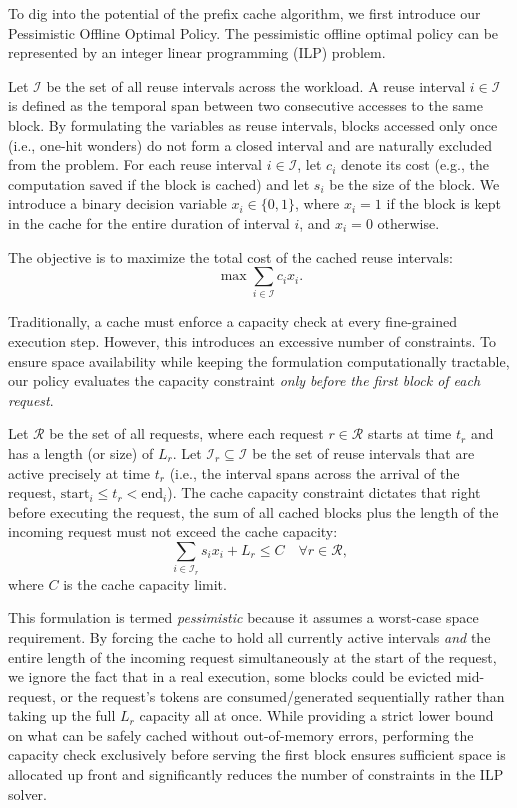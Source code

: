\documentclass[letterpaper,twocolumn,10pt]{article}
\begin{document}
To dig into the potential of the prefix cache algorithm, we first introduce
our Pessimistic Offline Optimal Policy. The pessimistic offline optimal policy
can be represented by an integer linear programming (ILP) problem.

Let $\mathcal{I}$ be the set of all reuse intervals across the workload. 
A reuse interval $i \in \mathcal{I}$ is defined as the temporal span between
two consecutive accesses to the same block. 
By formulating the variables as reuse intervals, blocks accessed only once
(i.e., one-hit wonders) do not form a closed interval and are naturally
excluded from the problem.
For each reuse interval $i \in \mathcal{I}$, let $c_i$ denote its cost
(e.g., the computation saved if the block is cached) and let $s_i$ be the size
of the block.
We introduce a binary decision variable $x_i \in \{0, 1\}$, where $x_i = 1$ if
the block is kept in the cache for the entire duration of interval $i$, and
$x_i = 0$ otherwise.

The objective is to maximize the total cost of the cached reuse intervals:
\begin{equation}
    \max \sum_{i \in \mathcal{I}} c_i x_i.
\end{equation}

Traditionally, a cache must enforce a capacity check at every fine-grained
execution step.
However, this introduces an excessive number of constraints.
To ensure space availability while keeping the formulation computationally
tractable, our policy evaluates the capacity constraint \emph{only before the
first block of each request}. 

Let $\mathcal{R}$ be the set of all requests, where each request
$r \in \mathcal{R}$ starts at time $t_r$ and has a length (or size) of $L_r$.
Let $\mathcal{I}_r \subseteq \mathcal{I}$ be the set of reuse intervals that
are active precisely at time $t_r$ (i.e., the interval spans across the arrival
of the request, $\text{start}_i \le t_r < \text{end}_i$).
The cache capacity constraint dictates that right before executing the request,
the sum of all cached blocks plus the length of the incoming request must not
exceed the cache capacity:
\begin{equation}
    \sum_{i \in \mathcal{I}_r} s_i x_i + L_r \le C \quad \forall r \in \mathcal{R},
\end{equation}
where $C$ is the cache capacity limit. 

This formulation is termed \emph{pessimistic} because it assumes a worst-case
space requirement.
By forcing the cache to hold all currently active intervals \emph{and} the
entire length of the incoming request simultaneously at the start of the request,
we ignore the fact that in a real execution, some blocks could be evicted
mid-request, or the request's tokens are consumed/generated sequentially
rather than taking up the full $L_r$ capacity all at once.
While providing a strict lower bound on what can be safely cached without
out-of-memory errors, performing the capacity check exclusively before
serving the first block ensures sufficient space is allocated up front and
significantly reduces the number of constraints in the ILP solver.
\end{document}
